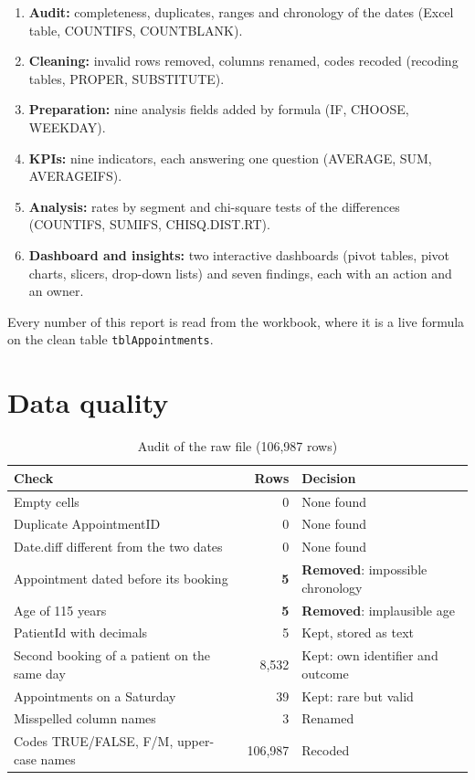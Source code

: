 \documentclass[12pt,a4paper]{article}
\newcommand{\F}[1]{{\small\texttt{#1}}}
\begin{document}
\begin{enumerate}
\item \textbf{Audit:} completeness, duplicates, ranges and chronology of the dates
(Excel table, COUNTIFS, COUNTBLANK).
\item \textbf{Cleaning:} invalid rows removed, columns renamed, codes recoded (recoding
tables, PROPER, SUBSTITUTE).
\item \textbf{Preparation:} nine analysis fields added by formula (IF, CHOOSE, WEEKDAY).
\item \textbf{KPIs:} nine indicators, each answering one question (AVERAGE, SUM,
AVERAGEIFS).
\item \textbf{Analysis:} rates by segment and chi-square tests of the differences
(COUNTIFS, SUMIFS, CHISQ.DIST.RT).
\item \textbf{Dashboard and insights:} two interactive dashboards (pivot tables, pivot
charts, slicers, drop-down lists) and seven findings, each with an action and an owner.
\end{enumerate}

Every number of this report is read from the workbook, where it is a live formula on
the clean table \F{tbl\allowbreak Appointments}.

\section{Data quality}\label{sec:quality}

\begin{table}[H]\centering\singlespacing
\caption{Audit of the raw file (106{,}987 rows)}
\small
\begin{tabularx}{\linewidth}{@{}>{\raggedright\arraybackslash}Xr>{\raggedright\arraybackslash}p{5.8cm}@{}}
\toprule
\textbf{Check} & \textbf{Rows} & \textbf{Decision} \\ \midrule
Empty cells & 0 & None found \\
Duplicate AppointmentID & 0 & None found \\
Date.diff different from the two dates & 0 & None found \\
Appointment dated before its booking & \textbf{5} & \textbf{Removed}: impossible chronology \\
Age of 115 years & \textbf{5} & \textbf{Removed}: implausible age \\
PatientId with decimals & 5 & Kept, stored as text \\
Second booking of a patient on the same day & 8{,}532 & Kept: own identifier and outcome \\
Appointments on a Saturday & 39 & Kept: rare but valid \\
Misspelled column names & 3 & Renamed \\
Codes TRUE/FALSE, F/M, upper-case names & 106{,}987 & Recoded \\
\bottomrule
\end{tabularx}
\end{table}
\end{document}
